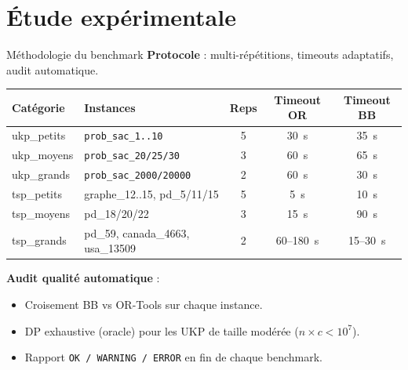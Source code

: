 \documentclass[aspectratio=169, 11pt]{beamer}
\begin{document}
\section{Étude expérimentale}

\begin{frame}{Méthodologie du benchmark}
\textbf{Protocole} : multi-répétitions, timeouts adaptatifs, audit automatique.

\vspace{0.3em}
\centering
\small
\begin{tabular}{llccc}
\toprule
\textbf{Catégorie} & \textbf{Instances} & \textbf{Reps} & \textbf{Timeout OR} & \textbf{Timeout BB} \\
\midrule
ukp\_petits  & \texttt{prob\_sac\_1..10}        & 5 & 30~s     & 35~s \\
ukp\_moyens  & \texttt{prob\_sac\_20/25/30}     & 3 & 60~s     & 65~s \\
ukp\_grands  & \texttt{prob\_sac\_2000/20000}   & 2 & 60~s     & 30~s \\
tsp\_petits  & graphe\_12..15, pd\_5/11/15      & 5 & 5~s      & 10~s \\
tsp\_moyens  & pd\_18/20/22                     & 3 & 15~s     & 90~s \\
tsp\_grands  & pd\_59, canada\_4663, usa\_13509 & 2 & 60--180~s & 15--30~s \\
\bottomrule
\end{tabular}

\vspace{0.6em}
\raggedright
\textbf{Audit qualité automatique} :
\begin{itemize}
  \item Croisement BB vs OR-Tools sur chaque instance.
  \item DP exhaustive (oracle) pour les UKP de taille modérée ($n \times c < 10^7$).
  \item Rapport \texttt{OK / WARNING / ERROR} en fin de chaque benchmark.
\end{itemize}
\end{frame}
\end{document}
